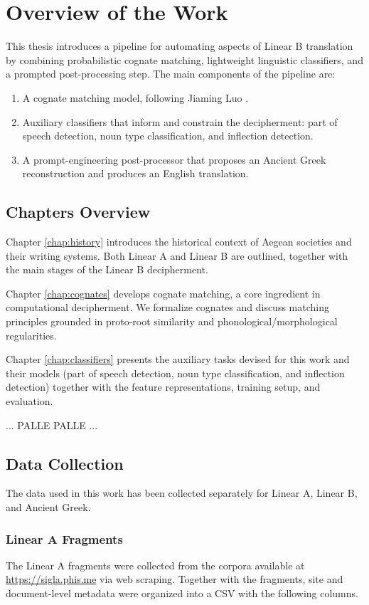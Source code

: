 \chapter{Overview of the Work}
This thesis introduces a pipeline for automating aspects of Linear B translation by combining probabilistic cognate matching, lightweight linguistic classifiers, and a prompted post-processing step.
The main components of the pipeline are:
\begin{enumerate}
    \item A cognate matching model, following Jiaming Luo \cite{luo}.
    \item Auxiliary classifiers that inform and constrain the decipherment: part of speech detection, noun type classification, and inflection detection.
    \item A prompt-engineering post-processor that proposes an Ancient Greek reconstruction and produces an English translation.
\end{enumerate}

\section{Chapters Overview}
Chapter \ref{chap:history} introduces the historical context of Aegean societies and their writing systems. Both Linear A and Linear B are outlined, together with the main stages of the Linear B decipherment.

Chapter \ref{chap:cognates} develops cognate matching, a core ingredient in computational decipherment. We formalize cognates and discuss matching principles grounded in proto-root similarity and phonological/morphological regularities.

Chapter \ref{chap:classifiers} presents the auxiliary tasks devised for this work and their models (part of speech detection, noun type classification, and inflection detection) together with the feature representations, training setup, and evaluation.

...
PALLE PALLE
... 

\section{Data Collection}
The data used in this work has been collected separately for Linear A, Linear B, and Ancient Greek.

\subsection{Linear A Fragments}
The Linear A fragments were collected from the corpora available at \url{https://sigla.phis.me} via web scraping.
Together with the fragments, site and document-level metadata were organized into a CSV with the following columns.


